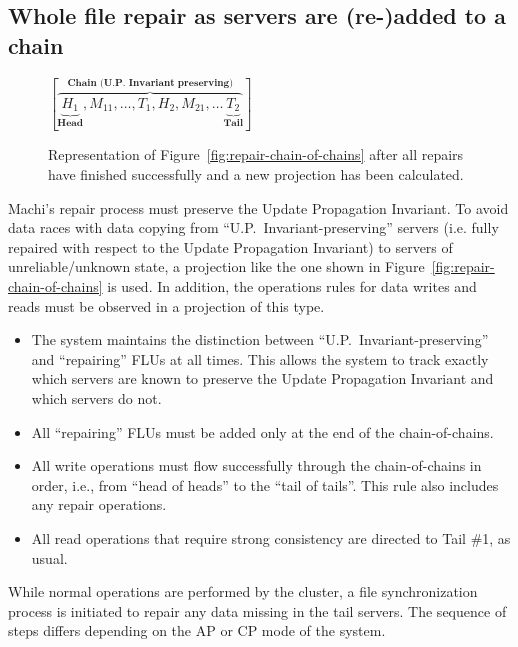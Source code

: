 \documentclass[preprint,10pt]{sigplanconf}
\begin{document}
\subsection{Whole file repair as servers are (re-)added to a chain}
\label{sub:repair-add-to-chain}

\begin{figure}
\centering
$
[\overbrace{\underbrace{H_1}_\textbf{Head}, M_{11}, \ldots, T_1,
                        H_2, M_{21},
                        \ldots
                        \underbrace{T_2}_\textbf{Tail}}^\textbf{Chain (U.P.~Invariant preserving)}
]
$
\caption{Representation of Figure~\ref{fig:repair-chain-of-chains}
  after all repairs have finished successfully and a new projection has
  been calculated.}
\label{fig:repair-chain-of-chains-finished}
\end{figure}

Machi's repair process must preserve the Update Propagation
Invariant.  To avoid data races with data copying from
``U.P.~Invariant-preserving'' servers (i.e. fully repaired with
respect to the Update Propagation Invariant)
to servers of unreliable/unknown state, a
projection like the one shown in
Figure~\ref{fig:repair-chain-of-chains} is used.  In addition, the
operations rules for data writes and reads must be observed in a
projection of this type.

\begin{itemize}

\item The system maintains the distinction between ``U.P.~Invariant-preserving''
  and ``repairing'' FLUs at all times.  This allows the system to
  track exactly which servers are known to preserve the Update
  Propagation Invariant and which servers do not.

\item All ``repairing'' FLUs must be added only at the end of the
  chain-of-chains.

\item All write operations must flow successfully through the
  chain-of-chains in order, i.e., from ``head of heads''
  to the ``tail of tails''.  This rule also includes any
  repair operations.

\item All read operations that require strong consistency are directed
  to Tail \#1, as usual.

\end{itemize}

While normal operations are performed by the cluster, a file
synchronization process is initiated to repair any data missing in the
tail servers.  The sequence of steps differs depending on the AP or CP
mode of the system.
\end{document}
